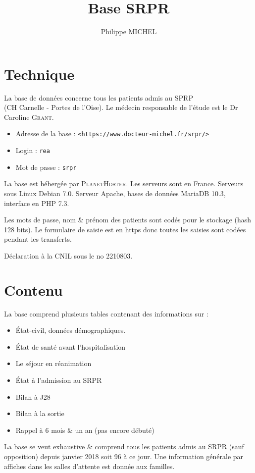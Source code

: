 \documentclass[a4paper, french]{tufte-handout}
\title{Base SRPR}
\author{Philippe MICHEL}
\begin{document}
 
%

\maketitle

\section*{Technique}
\label{Technique}


La base de données concerne tous les patients admis au SPRP\\ (CH
Carnelle - Portes de l'Oise). Le médecin responsable de l'étude est le
Dr Caroline \textsc{Grant}.

\begin{itemize}
\item Adresse de la base : \texttt{<https://www.docteur-michel.fr/srpr/>}
\item  Login : \texttt{rea}
\item Mot de passe : \texttt{srpr}
\end{itemize}


La base est hébergée par \textsc{PlanetHoster}. Les serveurs sont en
France. Serveurs sous Linux Debian 7.0. Serveur Apache, bases de données
MariaDB 10.3, interface en PHP 7.3.

Les mots de passe, nom \& prénom des patients sont codés pour le
stockage (hash 128 bits). Le formulaire de saisie est en https donc toutes les
saisies sont codées pendant les transferts.

Déclaration à la CNIL sous le no 2210803.

\section*{Contenu}

La base comprend plusieurs tables contenant des informations sur :
\begin{itemize}
\item État-civil, données démographiques. 
\item État de santé avant l'hospitalisation
\item Le séjour en réanimation
\item État à l'admission au SRPR
\item Bilan à J28
\item Bilan à la sortie
\item Rappel à 6 mois \& un an (pas encore débuté)
\end{itemize}

La base se veut exhaustive \& comprend tous les patients admis au SRPR
(sauf opposition) depuis janvier 2018 soit 96 à ce jour. Une
information générale par affiches dans les salles d'attente est donnée
aux familles.
%
% 
\end{document}
